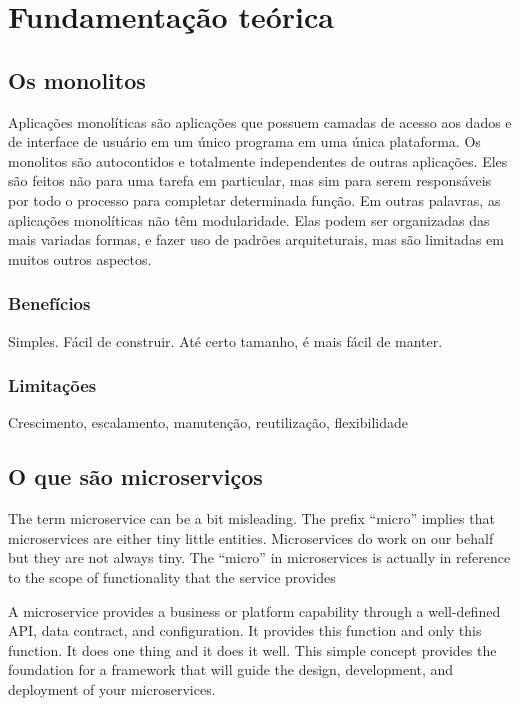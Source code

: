 \chapter{Fundamentação teórica}\label{cap_exemplos}


\section{Os monolitos}

Aplicações monolíticas são aplicações que possuem camadas de acesso aos dados e de interface de usuário em um único programa em uma única plataforma. Os monolitos são autocontidos e totalmente independentes de outras aplicações. Eles são feitos não para uma tarefa em particular, mas sim para serem responsáveis por todo o processo para completar determinada função. Em outras palavras, as aplicações monolíticas não têm modularidade. Elas podem ser organizadas das mais variadas formas, e fazer uso de padrões arquiteturais, mas são limitadas em muitos outros aspectos.

\subsection{Benefícios}

Simples. Fácil de construir. Até certo tamanho, é mais fácil de manter.

\subsection{Limitações}

Crescimento, escalamento, manutenção, reutilização, flexibilidade

\section{O que são microserviços}

The term microservice can be a bit misleading. The prefix “micro” implies that microservices are either tiny little entities. Microservices do work on our behalf but they are not always tiny. The “micro” in microservices is actually in reference to the scope of functionality that the service provides

A microservice provides a business or platform capability through a well-defined API, data contract, and configuration. It provides this function and only this function. It does one thing and it does it well. This simple concept provides the foundation for a framework that will guide the design, development, and deployment of your microservices.

